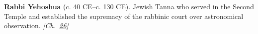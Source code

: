 \textbf{Rabbi Yehoshua} (c. 40 CE–c. 130 CE). Jewish Tanna who served in the Second Temple and established the supremacy of the rabbinic court over astronomical observation. \emph{[Ch.~\hyperref[ch:jewishcalendar]{26}]}

